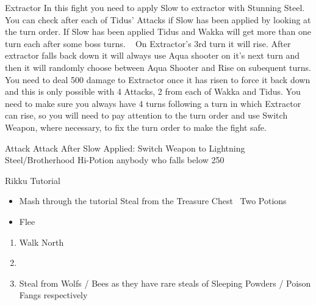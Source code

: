 \begin{battle}[4000]{Extractor}
In this fight you need to apply Slow to extractor with Stunning Steel. You can check after each of Tidus' Attacks if Slow has been applied by looking at the turn order. If Slow has been applied Tidus and Wakka will get more than one turn each after some boss turns.
\newline \ \newline
On Extractor's 3rd turn it will rise. After extractor falls back down it will always use Aqua shooter on it's next turn and then it will randomly choose between Aqua Shooter and Rise on subequent turns. You need to deal 500 damage to Extractor once it has risen to force it back down and this is only possible with 4 Attacks, 2 from each of Wakka and Tidus. You need to make sure you always have 4 turns following a turn in which Extractor can rise, so you will need to pay attention to the turn order and use Switch Weapon, where necessary, to fix the turn order to make the fight safe.
\newline \ \newline
	\begin{itemize}
		\tidusf Attack
		\wakkaf Attack
		\tidusf After Slow Applied: Switch Weapon to Lightning Steel/Brotherhood
		\wakkaf Hi-Potion anybody who falls below 250
	\end{itemize}
\end{battle}
\begin{battle}{Rikku Tutorial}
	\begin{itemize}
		\item Mash through the tutorial
		\rikkuf Steal from the Treasure Chest
		\rikkuf \od\ Two Potions
		\item Flee
	\end{itemize}
\end{battle}
\begin{enumerate}[resume]
	\item Walk North
	\item \formation{\tidus}{\rikku}{\auron}
	\item Steal from Wolfs / Bees as they have rare steals of Sleeping Powders / Poison Fangs respectively
\end{enumerate}